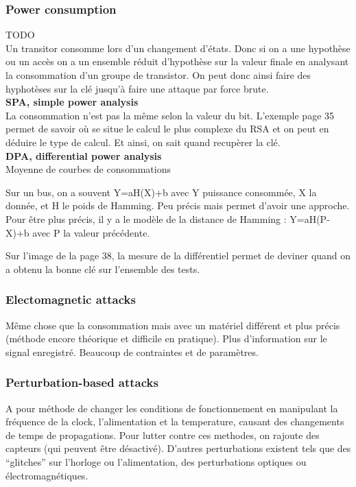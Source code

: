 \documentclass[a4paper,12pt]{article}
\begin{document}
\subsubsection{Power consumption}
TODO
\\
Un transitor consomme lors d'un changement d'états. Donc si on a une hypothèse ou un accès on a un ensemble réduit d'hypothèse sur la valeur finale en analysant la consommation d'un groupe de transistor. On peut donc ainsi faire des hyphotèses sur la clé jusqu'à faire une attaque par force brute.\\
\large{\textbf{SPA, simple power analysis}}\\
La consommation n'est pas la même selon la valeur du bit.
L'exemple page 35 permet de savoir où se situe le calcul le plus complexe du RSA et on peut en déduire le type de calcul. Et ainsi, on sait quand recupèrer la clé.\\
\large{\textbf{DPA, differential power analysis}}\\
Moyenne de courbes de consommations

Sur un bus, on a souvent Y=aH(X)+b avec Y puissance consommée, X la donnée, et H le poids de Hamming. Peu précis mais permet d'avoir une approche.
Pour être plus précis, il y a le modèle de la distance de Hamming : Y=aH(P-X)+b avec P la valeur précédente.

Sur l'image de la page 38, la mesure de la différentiel permet de deviner quand on a obtenu la bonne clé sur l'ensemble des tests.


\subsubsection{Electomagnetic attacks}
Même chose que la consommation mais avec un matériel différent et plus précis (méthode encore théorique et difficile en pratique). Plus d'information sur le signal enregistré. Beaucoup de contraintes et de paramètres.

\subsubsection{Perturbation-based attacks}
A pour méthode de changer les conditions de fonctionnement en manipulant la fréquence de la clock, l'alimentation et la temperature, causant des changements de temps de propagations. Pour lutter contre ces methodes, on rajoute des capteurs (qui peuvent être désactivé).
D'autres perturbations existent tels que des ``glitches'' sur l'horloge ou l'alimentation, des perturbations optiques ou électromagnétiques.\\
\end{document}

